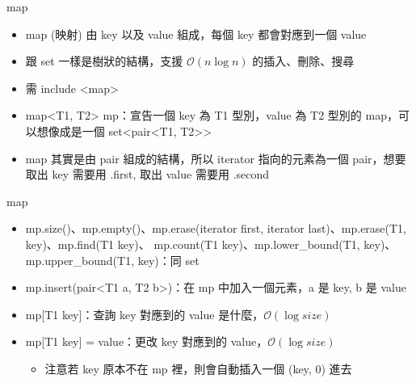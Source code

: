 \documentclass[aspectratio=169]{beamer}
\begin{document}
    \begin{frame}{map}
        \begin{itemize}
            \item<1-> map (映射) 由 key 以及 value 組成，每個 key 都會對應到一個 value
            \item<1-> 跟 set 一樣是樹狀的結構，支援 $\mathcal{O}(n\log n)$ 的插入、刪除、搜尋
            \item<1-> 需 include <map>
            \item<2-> map<T1, T2> mp：宣告一個 key 為 T1 型別，value 為 T2 型別的 map，可以想像成是一個 set<pair<T1, T2>> 
            \item<3-> map 其實是由 pair 組成的結構，所以 iterator 指向的元素為一個 pair，想要取出 key 需要用 .first, 取出 value 需要用 .second
        \end{itemize}
    \end{frame}

    \begin{frame}{map}
        \begin{itemize}
            \item<1-> mp.size()、mp.empty()、mp.erase(iterator first, iterator last)、mp.erase(T1, key)、mp.find(T1 key)、
            mp.count(T1 key)、mp.lower\_bound(T1, key)、mp.upper\_bound(T1, key)：同 set
            \item<2-> mp.insert(pair<T1 a, T2 b>)：在 mp 中加入一個元素，a 是 key, b 是 value
            \item<3-> mp[T1 key]：查詢 key 對應到的 value 是什麼，$\mathcal{O}(\log size)$
            \item<3-> mp[T1 key] = value：更改 key 對應到的 value，$\mathcal{O}(\log size)$
                \begin{itemize}
                    \item<4-> 注意若 key 原本不在 mp 裡，則會自動插入一個 (key, 0) 進去
                \end{itemize}
        \end{itemize}
    \end{frame}
\end{document}
